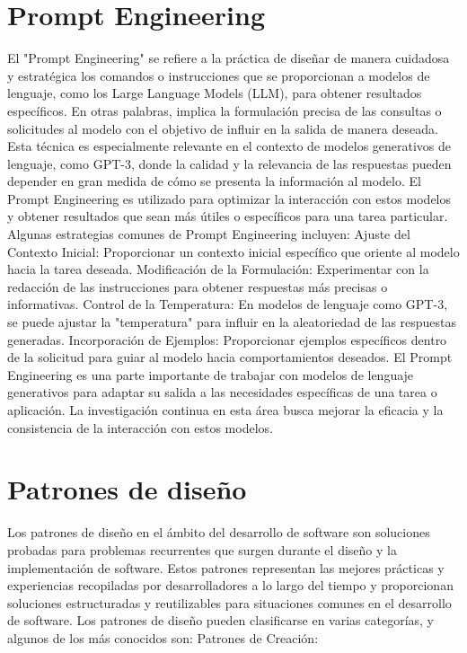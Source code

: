 \section{Prompt Engineering}
El "Prompt Engineering" se refiere a la práctica de diseñar de manera cuidadosa y estratégica los comandos o instrucciones que se proporcionan a modelos de lenguaje, como los Large Language Models (LLM), para obtener resultados específicos. En otras palabras, implica la formulación precisa de las consultas o solicitudes al modelo con el objetivo de influir en la salida de manera deseada.
Esta técnica es especialmente relevante en el contexto de modelos generativos de lenguaje, como GPT-3, donde la calidad y la relevancia de las respuestas pueden depender en gran medida de cómo se presenta la información al modelo. El Prompt Engineering es utilizado para optimizar la interacción con estos modelos y obtener resultados que sean más útiles o específicos para una tarea particular.
Algunas estrategias comunes de Prompt Engineering incluyen:
Ajuste del Contexto Inicial: Proporcionar un contexto inicial específico que oriente al modelo hacia la tarea deseada.
Modificación de la Formulación: Experimentar con la redacción de las instrucciones para obtener respuestas más precisas o informativas.
Control de la Temperatura: En modelos de lenguaje como GPT-3, se puede ajustar la "temperatura" para influir en la aleatoriedad de las respuestas generadas.
Incorporación de Ejemplos: Proporcionar ejemplos específicos dentro de la solicitud para guiar al modelo hacia comportamientos deseados.
El Prompt Engineering es una parte importante de trabajar con modelos de lenguaje generativos para adaptar su salida a las necesidades específicas de una tarea o aplicación. La investigación continua en esta área busca mejorar la eficacia y la consistencia de la interacción con estos modelos.

\section{Patrones de diseño}
Los patrones de diseño en el ámbito del desarrollo de software son soluciones probadas para problemas recurrentes que surgen durante el diseño y la implementación de software. Estos patrones representan las mejores prácticas y experiencias recopiladas por desarrolladores a lo largo del tiempo y proporcionan soluciones estructuradas y reutilizables para situaciones comunes en el desarrollo de software.
Los patrones de diseño pueden clasificarse en varias categorías, y algunos de los más conocidos son:
Patrones de Creación:

